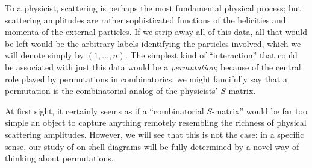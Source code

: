 \documentclass[12pt,hyperref,compress]{JHEP3}
\begin{document}
To a physicist, scattering is perhaps the most fundamental physical process; but scattering amplitudes are rather sophisticated functions of the helicities and momenta of the external particles. If we strip-away all of this data, all that would be left would be the arbitrary labels identifying the particles involved, which we will denote simply by $(1,\ldots,n)$. The simplest kind of ``interaction'' that could be associated with just this data would be a {\it permutation}; because of the central role played by permutations in combinatorics, we might fancifully say that a permutation is the combinatorial analog of the physicists' $S$-matrix.

At first sight, it certainly seems as if a ``combinatorial $S$-matrix'' would be far too simple an object to capture anything remotely resembling the richness of physical scattering amplitudes. However, we will see that this is not the case: in a specific sense, our study of on-shell diagrams will be fully determined by a novel way of thinking about permutations.
\end{document}
